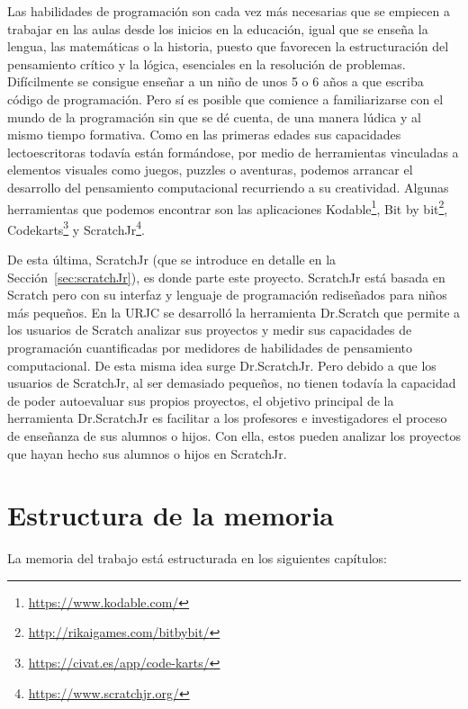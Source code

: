 \documentclass[a4paper, 12pt]{book}
\begin{document}
Las habilidades de programación son cada vez  más necesarias que se empiecen a trabajar en las aulas desde los inicios en la educación, igual que se enseña la lengua, las matemáticas o la historia, puesto que favorecen la estructuración del pensamiento crítico y la lógica, esenciales en la resolución de problemas.
Difícilmente se consigue enseñar a un niño de unos 5 o 6 años a que escriba código de programación.
Pero sí es posible que comience a familiarizarse con el mundo de la programación sin que se dé cuenta, de una manera lúdica y al mismo tiempo formativa.
Como en las primeras edades sus capacidades lectoescritoras todavía están formándose, por medio de herramientas vinculadas a elementos visuales como juegos, puzzles o aventuras, podemos arrancar el desarrollo del pensamiento computacional recurriendo a su creatividad. Algunas herramientas que podemos encontrar son las aplicaciones Kodable\footnote{\url{https://www.kodable.com/}}, Bit by bit\footnote{\url{http://rikaigames.com/bitbybit/}}, Codekarts\footnote{\url{https://civat.es/app/code-karts/}} y ScratchJr\footnote{\url{https://www.scratchjr.org/}}. 

De esta última, ScratchJr (que se introduce en detalle en la Sección~\ref{sec:scratchJr}), es donde parte este proyecto.
ScratchJr está basada en Scratch pero con su interfaz y lenguaje de programación rediseñados para niños más pequeños.
En la URJC se desarrolló la herramienta Dr.Scratch que permite a los usuarios de Scratch analizar sus proyectos y medir sus capacidades de programación cuantificadas por medidores de habilidades de pensamiento computacional.
De esta misma idea surge Dr.ScratchJr.
Pero debido a que los usuarios de ScratchJr, al ser demasiado pequeños, no tienen todavía la capacidad de poder autoevaluar sus propios proyectos, el objetivo principal de la herramienta Dr.ScratchJr es facilitar a los profesores e investigadores el proceso de enseñanza de sus alumnos o hijos.
Con ella, estos pueden analizar los proyectos que hayan hecho sus alumnos o hijos en ScratchJr.

\section{Estructura de la memoria}
\label{sec:estructura}

La memoria del trabajo está estructurada en los siguientes capítulos:
\end{document}
